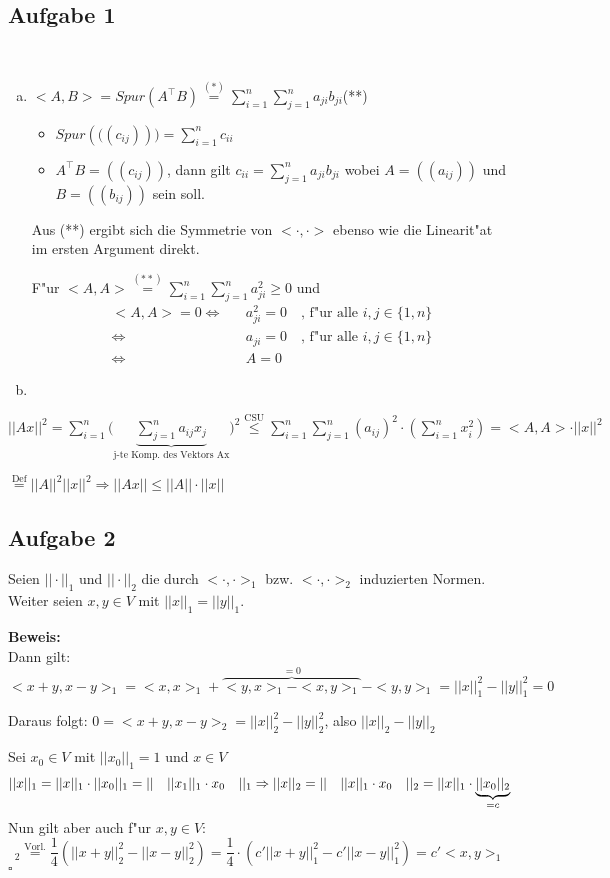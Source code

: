 \documentclass[a4paper,twoside,DIV15,BCOR12mm]{scrbook}
\newcommand{\enua}{\ \begin{enumerate}[a)]}
\newcommand{\une}{\end{enumerate}}
\newcommand{\RA}{\Rightarrow}
\newcommand{\LRA}{\Leftrightarrow}
\newcommand{\x}{\cdot}
\newcommand{\trans}{^\top}
\newenvironment{bew}{\pagebreak[2]\textbf{Beweis: }}{\qed}
\renewcommand{\qed}{\hspace*{\fill} \ensuremath{\square}}
\begin{document}
\subsection {Aufgabe 1}
\enua
\item
$<A,B>=Spur(A\trans B)\overset{(*)}=\sum\limits_{i=1}^n{\sum\limits_{j=1}^n{a_{ji}b_{ji}}}$\quad\quad (**)
\begin{itemize}
\item $Spur \left(((c_{ij})\right) )=\sum\limits_{i=1}^nc_{ii}$
\item $A\trans B=((c_{ij}))$, dann gilt $c_{ii}=\sum\limits_{j=1}^n{a_{ji}b_{ji}}$ wobei $A=((a_{ij}))$ und $B=((b_{ij}))$ sein soll.
\end{itemize}
Aus (**) ergibt sich die Symmetrie von $<\x,\x>$ ebenso wie die Linearit"at im ersten Argument direkt.\par
F"ur $<A,A>\overset{(**)}=\sum\limits_{i=1}^n{\sum\limits_{j=1}^n{a_{ji}^2\ge0}}$ und
\begin{eqnarray*}
<A,A>=0  \LRA & & a_{ji}^2=0\quad\text{, f"ur alle }i,j\in\{1,n\}\\
\LRA & & a_{ji}=0\quad\text{, f"ur alle }i,j\in\{1,n\}\\
\LRA & & A=0
\end{eqnarray*}
\item
\une
$||Ax||^2=\sum\limits_{i=1}^n({\underbrace{\sum\limits_{j=1}^n{a_{ij}x_j}}_{\text{j-te Komp. des Vektors Ax}})^2}\overset{\text{CSU}}\le\sum\limits_{i=1}^n{\sum\limits_{j=1}^n{(a_{ij})^2}}\x(\sum\limits_{i=1}^n{x_i^2})=<A,A>\x||x||^2$\par$\overset{\text{Def}}=||A||^2||x||^2\RA||Ax||\le||A||\x||x||$
\subsection {Aufgabe 2}
Seien $||\x||_1$ und $||\x||_2$ die durch $<\x,\x>_1$ bzw. $<\x,\x>_2$ induzierten Normen.\\
Weiter seien $x,y\in V$ mit $||x||_1=||y||_1$.\par
\begin{bew}\\
Dann gilt: $<x+y,x-y>_1=<x,x>_1+\overbrace{<y,x>_1-<x,y>_1}^{=0}-<y,y>_1=||x||_1^2-||y||_1^2=0$\par
Daraus folgt: $0=<x+y,x-y>_2=||x||_2^2-||y||_2^2$, also $||x||_2-||y||_2$\par
Sei $x_0\in V$ mit $||x_0||_1=1$ und $x\in V$
\[||x||_1=||x||_1\x||x_0||_1=||\quad||x_1||_1\x x_0\quad||_1\\
\RA||x||_2=||\quad||x||_1\x x_0\quad||_2=||x||_1\x \underbrace{||x_0||_2}_{=c}\]
Nun gilt aber auch f"ur $x,y\in V$:
\[<x,y>_2\overset{\text{Vorl.}}=\frac14(||x+y||_2^2-||x-y||_2^2)=\frac14\x(c'||x+y||_1^2-c'||x-y||_1^2)=c'<x,y>_1\]
\end{bew}
\end{document}
